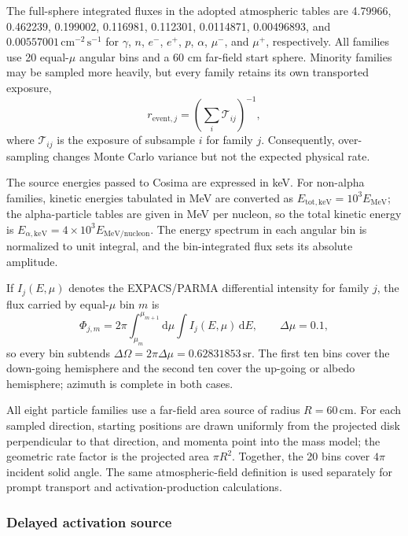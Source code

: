 \documentclass[11pt]{article}
\begin{document}
The full-sphere integrated fluxes in the adopted atmospheric tables are 4.79966, 0.462239, 0.199002,
0.116981, 0.112301, 0.0114871, 0.00496893, and
$0.00557001\,\mathrm{cm^{-2}\,s^{-1}}$ for $\gamma$, $n$, $e^-$, $e^+$, $p$,
$\alpha$, $\mu^-$, and $\mu^+$, respectively. All families use 20 equal-$\mu$
angular bins and a 60 cm far-field start sphere. Minority families may be sampled
more heavily, but every family retains its own transported exposure,
\begin{equation}
  r_{\mathrm{event},j}=\left(\sum_i \mathcal{T}_{ij}\right)^{-1},
\end{equation}
where $\mathcal{T}_{ij}$ is the exposure of subsample $i$ for family $j$.
Consequently, over-sampling changes Monte Carlo variance but not the expected
physical rate.

The source energies passed to Cosima are expressed in keV. For non-alpha
families, kinetic energies tabulated in MeV are converted as
$E_{\mathrm{tot,keV}}=10^3E_{\mathrm{MeV}}$; the alpha-particle tables are given
in MeV per nucleon, so the total kinetic energy is
$E_{\alpha,\mathrm{keV}}=4\times10^3E_{\mathrm{MeV/nucleon}}$. The energy spectrum
in each angular bin is normalized to unit integral, and the bin-integrated flux
sets its absolute amplitude.

If $I_j(E,\mu)$ denotes the EXPACS/PARMA differential intensity for family $j$,
the flux carried by equal-$\mu$ bin $m$ is
\begin{equation}
 \Phi_{j,m}=2\pi\int_{\mu_m}^{\mu_{m+1}}\!\mathrm d\mu
             \int I_j(E,\mu)\,\mathrm dE,
 \qquad \Delta\mu=0.1,
 \label{eq:source_bin_flux}
\end{equation}
so every bin subtends $\Delta\Omega=2\pi\Delta\mu=0.62831853\,\mathrm{sr}$.
The first ten bins cover the down-going hemisphere and the second ten cover the
up-going or albedo hemisphere; azimuth is complete in both cases.

All eight particle families use a far-field area source of radius
$R=60\,\mathrm{cm}$. For each sampled direction, starting positions are drawn
uniformly from the projected disk perpendicular to that direction, and momenta
point into the mass model; the geometric rate factor is the projected area
$\pi R^2$. Together, the 20 bins cover $4\pi$ incident solid angle. The same
atmospheric-field definition is used separately for prompt transport and
activation-production calculations.

\subsubsection{Delayed activation source}
\label{subsec:delayed_source}
\end{document}
